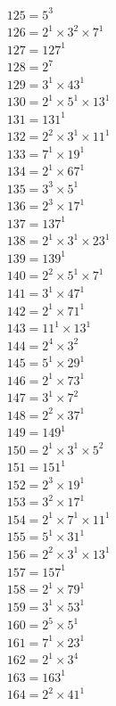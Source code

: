 \begin{equation*}
\begin{aligned}
& 125 = 5^{3} \\
& 126 = 2^{1} × 3^{2} × 7^{1} \\
& 127 = 127^{1} \\
& 128 = 2^{7} \\
& 129 = 3^{1} × 43^{1} \\
& 130 = 2^{1} × 5^{1} × 13^{1} \\
& 131 = 131^{1} \\
& 132 = 2^{2} × 3^{1} × 11^{1} \\
& 133 = 7^{1} × 19^{1} \\
& 134 = 2^{1} × 67^{1} \\
& 135 = 3^{3} × 5^{1} \\
& 136 = 2^{3} × 17^{1} \\
& 137 = 137^{1} \\
& 138 = 2^{1} × 3^{1} × 23^{1} \\
& 139 = 139^{1} \\
& 140 = 2^{2} × 5^{1} × 7^{1} \\
& 141 = 3^{1} × 47^{1} \\
& 142 = 2^{1} × 71^{1} \\
& 143 = 11^{1} × 13^{1} \\
& 144 = 2^{4} × 3^{2} \\
& 145 = 5^{1} × 29^{1} \\
& 146 = 2^{1} × 73^{1} \\
& 147 = 3^{1} × 7^{2} \\
& 148 = 2^{2} × 37^{1} \\
& 149 = 149^{1} \\
& 150 = 2^{1} × 3^{1} × 5^{2} \\
& 151 = 151^{1} \\
& 152 = 2^{3} × 19^{1} \\
& 153 = 3^{2} × 17^{1} \\
& 154 = 2^{1} × 7^{1} × 11^{1} \\
& 155 = 5^{1} × 31^{1} \\
& 156 = 2^{2} × 3^{1} × 13^{1} \\
& 157 = 157^{1} \\
& 158 = 2^{1} × 79^{1} \\
& 159 = 3^{1} × 53^{1} \\
& 160 = 2^{5} × 5^{1} \\
& 161 = 7^{1} × 23^{1} \\
& 162 = 2^{1} × 3^{4} \\
& 163 = 163^{1} \\
& 164 = 2^{2} × 41^{1} \\

\end{aligned}
\end{equation*}
